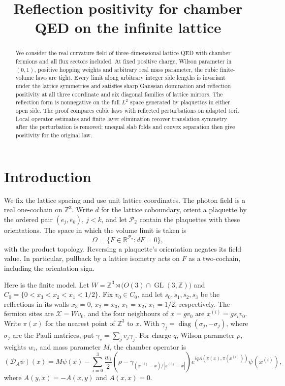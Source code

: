 \documentclass[11pt,letterpaper,reqno]{amsart}
\title[Reflection positivity on the infinite lattice]{Reflection positivity for chamber QED on the infinite lattice}
\date{}
\newcommand{\R}{\mathbb R}
\newcommand{\Z}{\mathbb Z}
\begin{document}
\begin{abstract}
We consider the real curvature field of three-dimensional lattice QED
with chamber fermions and all flux sectors included. At fixed positive
charge, Wilson parameter in $(0,1)$, positive hopping weights and
arbitrary real mass parameter, the cubic finite-volume laws are tight.
Every limit along arbitrary integer side lengths is invariant under
the lattice symmetries and satisfies sharp Gaussian domination and
reflection positivity at all three coordinate and six diagonal
families of lattice mirrors. The reflection form is nonnegative on
the full $L^2$ space generated by plaquettes in either open side.
The proof compares cubic laws with reflected perturbations on adapted
tori. Local operator estimates and finite layer elimination recover
translation symmetry after the perturbation is removed; unequal slab
folds and convex separation then give positivity for the original law.
\end{abstract}
\maketitle
\tableofcontents
\section{Introduction}\label{sec:introduction}

We fix the lattice spacing and use unit lattice coordinates. The photon
field is a real one-cochain on $\Z^3$. Write $d$ for the lattice
coboundary, orient a plaquette by the ordered pair $(e_j,e_k)$, $j<k$,
and let $\mathcal P_2$ contain the plaquettes with these orientations.
The space in which the volume limit is taken is
\[
 \Omega=\{F\in\R^{\mathcal P_2}:dF=0\},
\]
with the product topology. Reversing a plaquette's orientation negates
its field value. In particular, pullback by a lattice isometry acts on
$F$ as a two-cochain, including the orientation sign.

Here is the finite model. Let
$W=\Z^3\rtimes\bigl(O(3)\cap\operatorname{GL}(3,\Z)\bigr)$ and
$C_0=\{0<x_3<x_2<x_1<1/2\}$. Fix $v_0\in C_0$, and let
$s_0,s_1,s_2,s_3$ be the reflections in its walls
$x_3=0$, $x_2=x_3$, $x_1=x_2$, $x_1=1/2$, respectively.
The fermion sites are $\mathcal X=Wv_0$, and the four neighbours
of $x=gv_0$ are $x^{(i)}=gs_iv_0$. Write $\pi(x)$ for the nearest
point of $\Z^3$ to $x$. With $\gamma_j=\operatorname{diag}(\sigma_j,-\sigma_j)$,
where $\sigma_j$ are the Pauli matrices, put $\gamma_v=\sum_jv_j\gamma_j$.
For charge $q$, Wilson parameter $\rho$, weights $w_i$, and mass
parameter $M$, the chamber operator is
\[
 (\mathcal D_A\psi)(x)
 =M\psi(x)-\sum_{i=0}^3\frac{w_i}{2}
   \left(\rho-\gamma_{(x^{(i)}-x)/|x^{(i)}-x|}\right)
   e^{iqA(\pi(x),\pi(x^{(i)}))}\psi(x^{(i)}),
\]
where $A(y,x)=-A(x,y)$ and $A(x,x)=0$.
\end{document}
